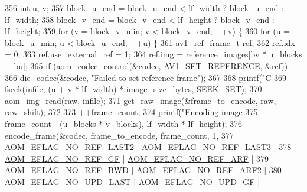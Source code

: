 \begin{DoxyCodeInclude}
{{{{{{{356       \textcolor{keywordtype}{int} u, v;
357       block\_u\_end = block\_u\_end < lf\_width ? block\_u\_end : lf\_width;
358       block\_v\_end = block\_v\_end < lf\_height ? block\_v\_end : lf\_height;
359       \textcolor{keywordflow}{for} (v = block\_v\_min; v < block\_v\_end; ++v) \{
360         \textcolor{keywordflow}{for} (u = block\_u\_min; u < block\_u\_end; ++u) \{
361           \hyperlink{structav1__ref__frame}{av1\_ref\_frame\_t} ref;
362           ref.\hyperlink{structav1__ref__frame_a7c6fcaba58f514985448cb2e2245345c}{idx} = 0;
363           ref.\hyperlink{structav1__ref__frame_a33749c5c20033cc5f7582d0ec1c34ff0}{use\_external\_ref} = 1;
364           ref.\hyperlink{structav1__ref__frame_a55a09db9e1acdd73e656b01fa01283b3}{img} = reference\_images[bv * u\_blocks + bu];
365           \textcolor{keywordflow}{if} (\hyperlink{group__codec_ga6da974f4eeaba1fa74106b28d0fe6ac5}{aom\_codec\_control}(&codec, \hyperlink{group__aom_gga9421a1fa78c0d9587ae5aa6c1cb3d659a51ad4467b4dc318406cceb257e2daa41}{AV1\_SET\_REFERENCE}, &ref))
366             die\_codec(&codec, \textcolor{stringliteral}{"Failed to set reference frame"});
367 
368           printf(\textcolor{stringliteral}{"C%
369           fseek(infile, (u + v * lf\_width) * image\_size\_bytes, SEEK\_SET);
370           aom\_img\_read(raw, infile);
371           get\_raw\_image(&frame\_to\_encode, raw, raw\_shift);
372 
373           ++frame\_count;
374           printf(\textcolor{stringliteral}{"Encoding image %
375                  frame\_count - (u\_blocks * v\_blocks), lf\_width * lf\_height);
376           encode\_frame(&codec, frame\_to\_encode, frame\_count, 1,
377                        \hyperlink{group__aom__encoder_ga50c2560ca6670298cfc614ecae96a391}{AOM\_EFLAG\_NO\_REF\_LAST2} | 
      \hyperlink{group__aom__encoder_gaa4bc8ae2b977b73f0ef57ba428ca1d2c}{AOM\_EFLAG\_NO\_REF\_LAST3} |
378                            \hyperlink{group__aom__encoder_gaaef6fe76991abf87edd2f296eee999f8}{AOM\_EFLAG\_NO\_REF\_GF} | 
      \hyperlink{group__aom__encoder_ga9e2f989737d63ddf4e987a525d186a46}{AOM\_EFLAG\_NO\_REF\_ARF} |
379                            \hyperlink{group__aom__encoder_ga758649aa6cd9fefb15ad888489884a38}{AOM\_EFLAG\_NO\_REF\_BWD} | 
      \hyperlink{group__aom__encoder_gad04799a74215e1b9609f7ccd1766f8c9}{AOM\_EFLAG\_NO\_REF\_ARF2} |
380                            \hyperlink{group__aom__encoder_ga7a55a46970c074b761319c5c46d87b6e}{AOM\_EFLAG\_NO\_UPD\_LAST} | 
      \hyperlink{group__aom__encoder_gaa81cc31f95fd463f51a158050d267a36}{AOM\_EFLAG\_NO\_UPD\_GF} |
}}}}}}}}}
\end{DoxyCodeInclude}

